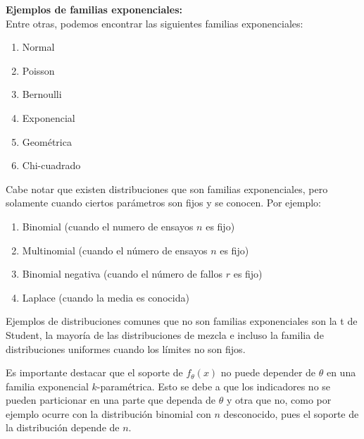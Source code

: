 \textbf{Ejemplos de familias exponenciales:}\\
Entre otras, podemos encontrar las siguientes familias exponenciales:
\begin{multicols}{2}
	\begin{enumerate}
		\item Normal
		\item Poisson
		\item Bernoulli
		\item Exponencial
		\item Geométrica
		\item Chi-cuadrado
	\end{enumerate}
	\end{multicols}
Cabe notar que existen distribuciones que son familias exponenciales, pero solamente cuando ciertos parámetros son fijos y se conocen. Por ejemplo:
\begin{enumerate}
	\item Binomial (cuando el numero de ensayos $n$ es fijo)
	\item Multinomial (cuando el número de ensayos $n$ es fijo)
	\item Binomial negativa (cuando el número de fallos $r$ es fijo)
	\item Laplace (cuando la media es conocida)
\end{enumerate}
Ejemplos de distribuciones comunes que no son familias exponenciales son la t de Student, la mayoría de las distribuciones de mezcla e incluso la familia de distribuciones uniformes cuando los límites no son fijos.

Es importante destacar que el soporte de $f_{\theta}(x)$ no puede depender de $\theta$ en una familia exponencial $k$-paramétrica. Esto se debe a que los indicadores no se pueden particionar en una parte que dependa de $\theta$ y otra que no, como por ejemplo ocurre con la distribución binomial con $n$ desconocido, pues el soporte de la distribución depende de $n$.\\

